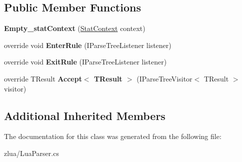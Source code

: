 \subsection*{Public Member Functions}
\begin{DoxyCompactItemize}
\item 
\mbox{\label{classzlua_1_1_lua_parser_1_1_empty__stat_context_ad17e975476c62719cea2bdbc23c5994d}} 
{\bfseries Empty\+\_\+stat\+Context} (\mbox{\hyperlink{classzlua_1_1_lua_parser_1_1_stat_context}{Stat\+Context}} context)
\item 
\mbox{\label{classzlua_1_1_lua_parser_1_1_empty__stat_context_aea9a1bf856ba3d7991900f9da48994b0}} 
override void {\bfseries Enter\+Rule} (I\+Parse\+Tree\+Listener listener)
\item 
\mbox{\label{classzlua_1_1_lua_parser_1_1_empty__stat_context_a07d23cc88827bd396adadf3a0ffe9bf4}} 
override void {\bfseries Exit\+Rule} (I\+Parse\+Tree\+Listener listener)
\item 
\mbox{\label{classzlua_1_1_lua_parser_1_1_empty__stat_context_aa489c47c104dc46439209050bbfc1b7f}} 
override T\+Result {\bfseries Accept$<$ T\+Result $>$} (I\+Parse\+Tree\+Visitor$<$ T\+Result $>$ visitor)
\end{DoxyCompactItemize}
\subsection*{Additional Inherited Members}


The documentation for this class was generated from the following file\+:\begin{DoxyCompactItemize}
\item 
zlua/Lua\+Parser.\+cs\end{DoxyCompactItemize}
